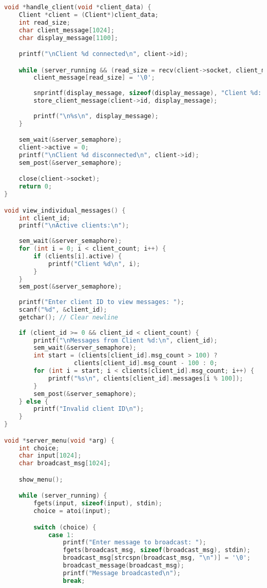 \documentclass{article}
\begin{document}
\begin{lstlisting}[language=C, caption= server code - Socket Programming Code]
void *handle_client(void *client_data) {
    Client *client = (Client*)client_data;
    int read_size;
    char client_message[1024];
    char display_message[1100];

    printf("\nClient %d connected\n", client->id);

    while (server_running && (read_size = recv(client->socket, client_message, 1024, 0)) > 0) {
        client_message[read_size] = '\0';
        
        snprintf(display_message, sizeof(display_message), "Client %d: %s", client->id, client_message);
        store_client_message(client->id, display_message);
        
        printf("\n%s\n", display_message);
    }

    sem_wait(&server_semaphore);
    client->active = 0;
    printf("\nClient %d disconnected\n", client->id);
    sem_post(&server_semaphore);

    close(client->socket);
    return 0;
}

void view_individual_messages() {
    int client_id;
    printf("\nActive clients:\n");
    
    sem_wait(&server_semaphore);
    for (int i = 0; i < client_count; i++) {
        if (clients[i].active) {
            printf("Client %d\n", i);
        }
    }
    sem_post(&server_semaphore);
    
    printf("Enter client ID to view messages: ");
    scanf("%d", &client_id);
    getchar(); // Clear newline
    
    if (client_id >= 0 && client_id < client_count) {
        printf("\nMessages from Client %d:\n", client_id);
        sem_wait(&server_semaphore);
        int start = (clients[client_id].msg_count > 100) ? 
                   clients[client_id].msg_count - 100 : 0;
        for (int i = start; i < clients[client_id].msg_count; i++) {
            printf("%s\n", clients[client_id].messages[i % 100]);
        }
        sem_post(&server_semaphore);
    } else {
        printf("Invalid client ID\n");
    }
}

void *server_menu(void *arg) {
    int choice;
    char input[1024];
    char broadcast_msg[1024];

    show_menu();

    while (server_running) {
        fgets(input, sizeof(input), stdin);
        choice = atoi(input);

        switch (choice) {
            case 1:
                printf("Enter message to broadcast: ");
                fgets(broadcast_msg, sizeof(broadcast_msg), stdin);
                broadcast_msg[strcspn(broadcast_msg, "\n")] = '\0';
                broadcast_message(broadcast_msg);
                printf("Message broadcasted\n");
                break;
                

\end{lstlisting}
\end{document}
